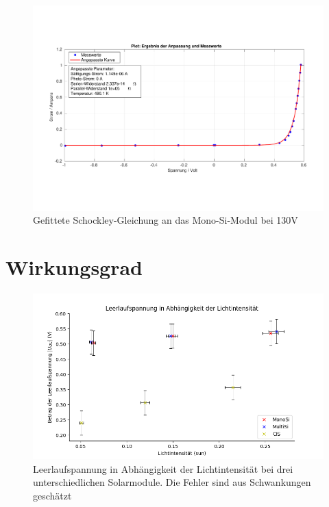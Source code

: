 \begin{figure}[ht]
    \centering
    \includegraphics[width = \linewidth]{Bilder/SiMultiDunkelPlot.pdf}
    \caption{Gefittete Schockley-Gleichung an das Mono-Si-Modul bei 130V}
\end{figure}
\clearpage

\section{Wirkungsgrad}
\label{section:AnhangWirkungsgrad}

\begin{figure}[ht]
    \centering
    \includegraphics[width = \linewidth]{Bilder/UOCInt.png}
    \caption{Leerlaufspannung in Abhängigkeit der Lichtintensität bei drei unterschiedlichen Solarmodule. Die Fehler 
    sind aus Schwankungen geschätzt}
\end{figure}

